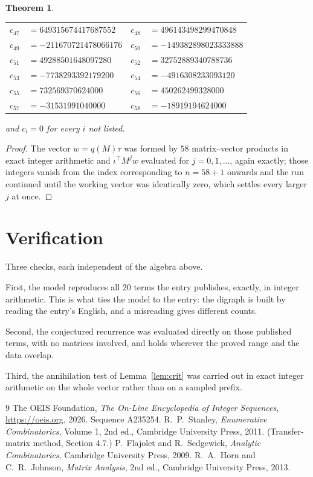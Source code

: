 \documentclass[11pt,a4paper]{article}
\theoremstyle{plain}
\newtheorem{theorem}{Theorem}
\theoremstyle{definition}
\begin{document}
\begin{theorem}
\begin{center}
\begin{tabular}{r@{\,}l@{\qquad}r@{\,}l}
$c_{47}$ & $=649315674417687552$ & $c_{48}$ & $=496143498299470848$ \\
$c_{49}$ & $=-211670721478066176$ & $c_{50}$ & $=-149382898023333888$ \\
$c_{51}$ & $=49288501648097280$ & $c_{52}$ & $=32752889340788736$ \\
$c_{53}$ & $=-7738293392179200$ & $c_{54}$ & $=-4916308233093120$ \\
$c_{55}$ & $=732569370624000$ & $c_{56}$ & $=450262499328000$ \\
$c_{57}$ & $=-31531991040000$ & $c_{58}$ & $=-18919194624000$ \\
\end{tabular}
\end{center}
and $c_i=0$ for every $i$ not listed.
\end{theorem}

\begin{proof}
The vector $w=q(M)\tau$ was formed by $58$ matrix--vector products in exact integer
arithmetic and $\iota^{\!\top}M^{j}w$ evaluated for $j=0,1,\dots$, again exactly; those
integers vanish from the index corresponding to $n=58+1$ onwards and the run continued
until the working vector was identically zero, which settles every larger $j$ at once.
\end{proof}

\section{Verification}

Three checks, each independent of the algebra above.

First, the model reproduces all $20$ terms the entry publishes, exactly, in integer
arithmetic. This is what ties the model to the entry: the digraph is built by reading the
entry's English, and a misreading gives different counts.

Second, the conjectured recurrence was evaluated directly on those published terms, with no
matrices involved, and holds wherever the proved range and the data overlap.

Third, the annihilation test of Lemma~\ref{lem:crit} was carried out in exact integer
arithmetic on the whole vector rather than on a sampled prefix.

\begin{thebibliography}{9}
 The OEIS Foundation, \emph{The On-Line Encyclopedia of Integer
Sequences}, \url{https://oeis.org}, 2026. Sequence A235254.
 R.~P.~Stanley, \emph{Enumerative Combinatorics}, Volume 1, 2nd ed.,
Cambridge University Press, 2011. (Transfer-matrix method, Section 4.7.)
 P.~Flajolet and R.~Sedgewick, \emph{Analytic Combinatorics}, Cambridge
University Press, 2009.
 R.~A.~Horn and C.~R.~Johnson, \emph{Matrix Analysis}, 2nd ed., Cambridge
University Press, 2013.
\end{thebibliography}
\end{document}
